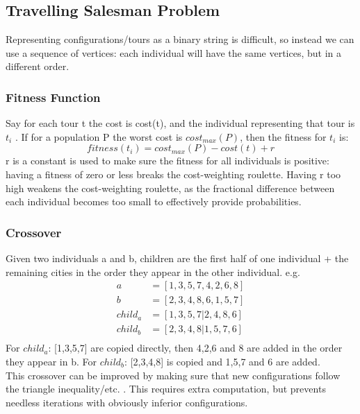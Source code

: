 \subsection{Travelling Salesman Problem}
Representing configurations/tours as a binary string is difficult, so instead we can use a sequence of vertices: each individual will have the same vertices, but in a different order.

\subsubsection{Fitness Function}
Say for each tour t the cost is cost(t), and the individual representing that tour is $t_i$ . If for a population P the worst cost is $cost_{max}(P)$, then the fitness for $t_i$ is:
\begin{equation}
    fitness(t_i) = cost_{max}(P) - cost(t) + r
\end{equation}
r is a constant is used to make sure the fitness for all individuals is positive: having a fitness of zero or less breaks the cost-weighting roulette. Having r too high weakens the cost-weighting roulette, as the fractional difference between each individual becomes too small to effectively provide probabilities. 

\subsubsection{Crossover}
Given two individuals a and b, children are the first half of one individual + the remaining cities in the order they appear in the other individual. e.g.
\begin{align}
    a &= [1,3,5,7,4,2,6,8] \nonumber \\
    b &= [2,3,4,8,6,1,5,7] \nonumber \\
    child_a &= [1,3,5,7|2,4,8,6] \nonumber \\
    child_b &= [2,3,4,8|1,5,7,6] \nonumber \\
\end{align}
For $child_a$: [1,3,5,7] are copied directly, then 4,2,6 and 8 are added in the order they appear in b. For $child_b$: [2,3,4,8] is copied and 1,5,7 and 6 are added.\\

This crossover can be improved by making sure that new configurations follow the triangle inequality/etc. .  This requires extra computation, but prevents needless iterations with obviously inferior configurations.


